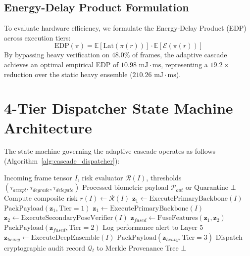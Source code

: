 \documentclass[10pt,journal,compsoc]{IEEEtran}
\begin{document}
\subsection{Energy-Delay Product Formulation}
To evaluate hardware efficiency, we formulate the Energy-Delay Product (EDP) across execution tiers:
\begin{equation}
\text{EDP}(\pi) = \mathbb{E}[\text{Lat}(\pi(r))] \cdot \mathbb{E}[\mathcal{E}(\pi(r))]
\end{equation}
By bypassing heavy verification on $48.0\%$ of frames, the adaptive cascade achieves an optimal empirical EDP of $10.98\text{ mJ}\cdot\text{ms}$, representing a $19.2\times$ reduction over the static heavy ensemble ($210.26\text{ mJ}\cdot\text{ms}$).

\section{4-Tier Dispatcher State Machine Architecture}
The state machine governing the adaptive cascade operates as follows (Algorithm~\ref{alg:cascade_dispatcher}):

\begin{algorithm}[t]
\caption{Dynamic Risk-Driven Cascade Dispatcher}
\label{alg:cascade_dispatcher}
\begin{algorithmic}[1]
\REQUIRE Incoming frame tensor $I$, risk evaluator $\mathcal{R}(I)$, thresholds $(\tau_{accept}, \tau_{degrade}, \tau_{delegate})$
\ENSURE Processed biometric payload $\mathcal{P}_{out}$ or Quarantine $\bot$
\STATE Compute composite risk $r(I) \leftarrow \mathcal{R}(I)$
    \STATE {}
    \STATE $\mathbf{z}_1 \leftarrow \text{ExecutePrimaryBackbone}(I)$ 
    \RETURN $\text{PackPayload}(\mathbf{z}_1, \text{Tier}=1)$
    \STATE {}
    \STATE $\mathbf{z}_1 \leftarrow \text{ExecutePrimaryBackbone}(I)$
    \STATE $\mathbf{z}_2 \leftarrow \text{ExecuteSecondaryPoseVerifier}(I)$
    \STATE $\mathbf{z}_{fused} \leftarrow \text{FuseFeatures}(\mathbf{z}_1, \mathbf{z}_2)$ 
    \RETURN $\text{PackPayload}(\mathbf{z}_{fused}, \text{Tier}=2)$
    \STATE {}
    \STATE Log performance alert to Layer 5
    \STATE $\mathbf{z}_{heavy} \leftarrow \text{ExecuteDeepEnsemble}(I)$
    \RETURN $\text{PackPayload}(\mathbf{z}_{heavy}, \text{Tier}=3)$
\ELSE
    \STATE {}
    \STATE Dispatch cryptographic audit record $\mathcal{Q}_t$ to Merkle Provenance Tree
    \RETURN $\bot$
\ENDIF
\end{algorithmic}
\end{algorithm}
\end{document}
